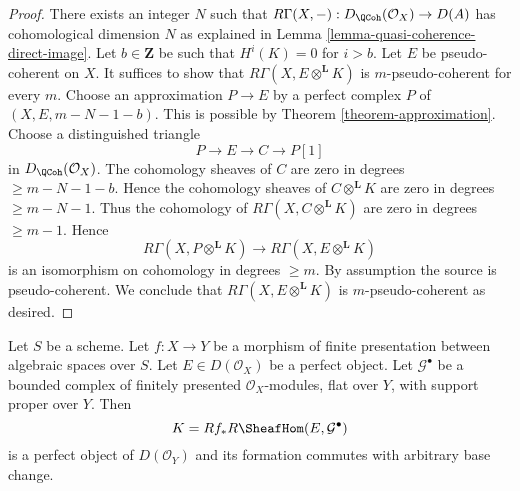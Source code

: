 \begin{proof}
There exists an integer $N$ such that
$R\Gamma(X, -) : D_\QCoh(\mathcal{O}_X) \to D(A)$
has cohomological dimension $N$ as explained in
Lemma \ref{lemma-quasi-coherence-direct-image}.
Let $b \in \mathbf{Z}$ be such that $H^i(K) = 0$ for $i > b$.
Let $E$ be pseudo-coherent on $X$.
It suffices to show that $R\Gamma(X, E \otimes^\mathbf{L} K)$
is $m$-pseudo-coherent for every $m$.
Choose an approximation $P \to E$ by a perfect complex $P$
of $(X, E, m - N - 1 - b)$. This is possible by
Theorem \ref{theorem-approximation}.
Choose a distinguished triangle
$$
P \to E \to C \to P[1]
$$
in $D_\QCoh(\mathcal{O}_X)$. The cohomology sheaves of $C$ are zero
in degrees $\geq m - N - 1 - b$. Hence the cohomology
sheaves of $C \otimes^\mathbf{L} K$ are zero in degrees $\geq m - N - 1$.
Thus the cohomology of $R\Gamma(X, C \otimes^\mathbf{L} K)$
are zero in degrees $\geq m - 1$. Hence
$$
R\Gamma(X, P \otimes^\mathbf{L} K) \to R\Gamma(X, E \otimes^\mathbf{L} K)
$$
is an isomorphism on cohomology in degrees $\geq m$.
By assumption the source is pseudo-coherent.
We conclude that $R\Gamma(X, E \otimes^\mathbf{L} K)$
is $m$-pseudo-coherent as desired.
\end{proof}

\begin{lemma}
\label{lemma-base-change-RHom-perfect}
Let $S$ be a scheme.
Let $f : X \to Y$ be a morphism of finite presentation
between algebraic spaces over $S$.
Let $E \in D(\mathcal{O}_X)$ be a perfect object. Let $\mathcal{G}^\bullet$
be a bounded complex of finitely presented $\mathcal{O}_X$-modules,
flat over $Y$, with support proper over $Y$. Then
$$
K = Rf_*R\SheafHom(E, \mathcal{G}^\bullet)
$$
is a perfect object of $D(\mathcal{O}_Y)$ and its formation
commutes with arbitrary base change.
\end{lemma}

